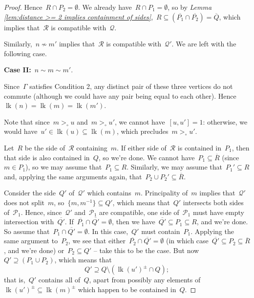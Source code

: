 \documentclass[11pt]{amsart}
\theoremstyle{definition}
\theoremstyle{definition}
\theoremstyle{definition}
\theoremstyle{definition}
\newcommand{\calQ}{\mathcal{Q}}
\newcommand{\calP}{\mathcal{P}} %
\newcommand{\calR}{\mathcal{R}} %
\newcommand{\link}[1]{\operatorname{lk}({#1})} %
\begin{document}
\begin{proof}
    Hence~$R \cap P_2 = \emptyset$. We already have~$R \cap P_1 = \emptyset$, so by \emph{Lemma \ref{lem:distance >= 2 implies containment of sides}},~$R \subseteq \left( \overline{P_1} \cap \overline{P_2} \right) = \overline{Q}$, which implies that~$\calR$ is compatible with~$\calQ$. 

    Similarly,~$n \not\sim m'$ implies that~$\calR$ is compatible with~$\calQ'$. We are left with the following case.

    \textbf{Case II:}~$n \sim m \sim m'$.

    Since~$\Gamma$ satisfies Condition 2, any distinct pair of these three vertices do not commute (although we could have any pair being equal to each other). Hence~$\link{n} = \link{m} = \link{m'}$.
    
    Note that since~$m >_\circ u$ and~$m >_\circ u'$, we cannot have~$[u, u'] = 1$: otherwise, we would have~$u' \in \link{u} \subseteq \link{m}$, which precludes~$m >_\circ u'$.

    Let~$R$ be the side of~$\calR$ containing~$m$. If either side of~$\calR$ is contained in~$P_1$, then that side is also contained in~$Q$, so we're done. We cannot have~$P_1 \subseteq \overline{R}$ (since~$m \in P_1$), so we may assume that~$P_1 \subseteq R$. Similarly, we may assume that~$P_1' \subseteq R$ and, applying the same arguments again, that~$P_2 \cup P_2' \subseteq \overline{R}$. 
    
    Consider the side~$Q'$ of~$\calQ'$ which contains~$m$. Principality of~$m$ implies that~$\calQ'$ does not split~$m$, so~$\{m, m^{-1}\} \subseteq Q'$, which means that~$Q'$ intersects both sides of~$\calP_1$. Hence, since~$\calQ'$ and~$\calP_1$ are compatible, one side of~$\calP_1$ must have empty intersection with~$\overline{Q'}$. If~$\overline{P_1} \cap \overline{Q'} = \emptyset$, then we have~$\overline{Q'} \subseteq P_1 \subseteq R$, and we're done. So assume that~$P_1 \cap \overline{Q'} = \emptyset$. In this case,~$Q'$ must contain~$P_1$. Applying the same argument to~$P_2$, we see that either~$\overline{P_2} \cap \overline{Q'} = \emptyset$ (in which case~$\overline{Q'} \subseteq P_2 \subseteq \overline{R}$, and we're done) or~$P_2 \subseteq Q'$ -- take this to be the case. But now~$Q' \supseteq \left(P_1 \cup P_2\right)$, which means that 
    \begin{equation}\label{eqn:Q in Q'}
        Q' \supseteq Q \setminus \left( \link{u'}^\pm \cap Q\right);
    \end{equation}
    that is,~$Q'$ contains all of~$Q$, apart from possibly any elements of~$\link{u'}^\pm \subseteq \link{m}^\pm$ which happen to be contained in~$Q$.


\end{proof}
\end{document}
